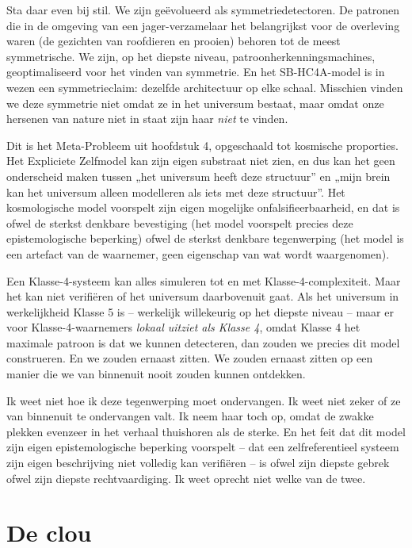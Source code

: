\documentclass[11pt, twoside, openright]{book}
\begin{document}
Sta daar even bij stil. We zijn geëvolueerd als symmetriedetectoren. De patronen die in de omgeving van een jager-verzamelaar het belangrijkst voor de overleving waren (de gezichten van roofdieren en prooien) behoren tot de meest symmetrische. We zijn, op het diepste niveau, patroonherkenningsmachines, geoptimaliseerd voor het vinden van symmetrie. En het SB-HC4A-model is in wezen een symmetrieclaim: dezelfde architectuur op elke schaal. Misschien vinden we deze symmetrie niet omdat ze in het universum bestaat, maar omdat onze hersenen van nature niet in staat zijn haar \textit{niet} te vinden.

Dit is het Meta-Probleem uit hoofdstuk 4, opgeschaald tot kosmische proporties. Het Expliciete Zelfmodel kan zijn eigen substraat niet zien, en dus kan het geen onderscheid maken tussen „het universum heeft deze structuur” en „mijn brein kan het universum alleen modelleren als iets met deze structuur”. Het kosmologische model voorspelt zijn eigen mogelijke onfalsifieerbaarheid, en dat is ofwel de sterkst denkbare bevestiging (het model voorspelt precies deze epistemologische beperking) ofwel de sterkst denkbare tegenwerping (het model is een artefact van de waarnemer, geen eigenschap van wat wordt waargenomen).

Een Klasse-4-systeem kan alles simuleren tot en met Klasse-4-complexiteit. Maar het kan niet verifiëren of het universum daarbovenuit gaat. Als het universum in werkelijkheid Klasse 5 is -- werkelijk willekeurig op het diepste niveau -- maar er voor Klasse-4-waarnemers \textit{lokaal uitziet als Klasse 4}, omdat Klasse 4 het maximale patroon is dat we kunnen detecteren, dan zouden we precies dit model construeren. En we zouden ernaast zitten. We zouden ernaast zitten op een manier die we van binnenuit nooit zouden kunnen ontdekken.

Ik weet niet hoe ik deze tegenwerping moet ondervangen. Ik weet niet zeker of ze van binnenuit te ondervangen valt. Ik neem haar toch op, omdat de zwakke plekken evenzeer in het verhaal thuishoren als de sterke. En het feit dat dit model zijn eigen epistemologische beperking voorspelt -- dat een zelfreferentieel systeem zijn eigen beschrijving niet volledig kan verifiëren -- is ofwel zijn diepste gebrek ofwel zijn diepste rechtvaardiging. Ik weet oprecht niet welke van de twee.


\section*{De clou}
\end{document}
